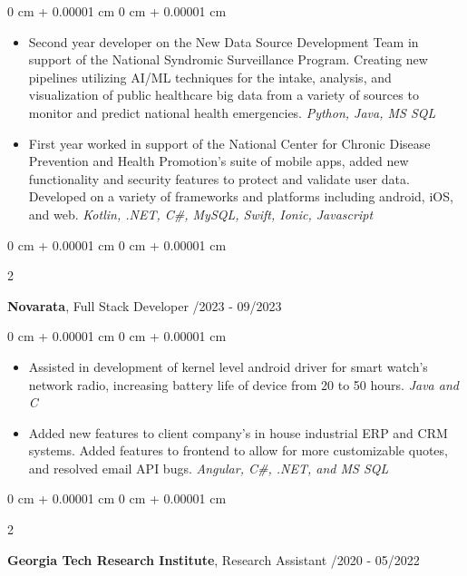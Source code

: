 \documentclass[10pt, letterpaper]{article}
\newenvironment{highlights}{
    \begin{itemize}[
        topsep=0.10 cm,
        parsep=0.10 cm,
        partopsep=0pt,
        itemsep=0pt,
        leftmargin=0 cm + 10pt
    ]
}{
    \end{itemize}
} %
\newenvironment{onecolentry}{
    \begin{adjustwidth}{
        0 cm + 0.00001 cm
    }{
        0 cm + 0.00001 cm
    }
}{
    \end{adjustwidth}
} %
\newenvironment{twocolentry}[2][]{
    \onecolentry
    \def\secondColumn{#2}
    \setcolumnwidth{\fill, 4.5 cm}
    \begin{paracol}{2}
}{
    \switchcolumn \raggedleft \secondColumn
    \end{paracol}
    \endonecolentry
} %
\begin{document}
        \vspace{0.10 cm}
        \begin{onecolentry}
            \begin{highlights}
                \item Second year developer on the New Data Source Development Team in support of the National Syndromic Surveillance Program. Creating new pipelines utilizing AI/ML techniques for the intake, analysis, and visualization of public healthcare big data from a variety of sources to monitor and predict national health emergencies. \textit{Python, Java, MS SQL}
                \item First year worked in support of the National Center for Chronic Disease Prevention and Health Promotion's suite of mobile apps, added new functionality and security features to protect and validate user data. Developed on a variety of frameworks and platforms including android, iOS, and web. \textit{Kotlin, .NET, C\#, MySQL, Swift, Ionic, Javascript}
            \end{highlights}
        \end{onecolentry}


        \vspace{0.2 cm}

        \begin{twocolentry}{
            03/2023 - 09/2023
        }
            \textbf{Novarata}, Full Stack Developer\end{twocolentry}

        \vspace{0.1 cm}
        \begin{onecolentry}
            \begin{highlights}
                \item Assisted in development of kernel level android driver for smart watch’s network radio, increasing battery life of device from 20 to 50 hours. \textit{Java and C}
                \item Added new features to client company’s in house industrial ERP and CRM systems. Added features to frontend to allow for more customizable quotes, and resolved email API bugs. \textit{Angular, C\#, .NET, and MS SQL}
            \end{highlights}
        \end{onecolentry}

        \vspace{0.2 cm}

        \begin{twocolentry}{
            01/2020 - 05/2022
        }
            \textbf{Georgia Tech Research Institute}, Research Assistant\end{twocolentry}
\end{document}

